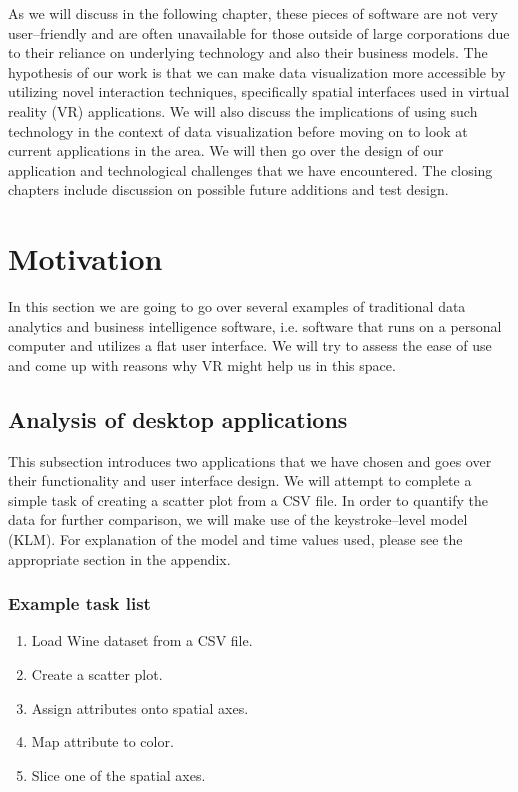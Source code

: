 \documentclass{article}
\begin{document}
As we will discuss in the following chapter, these pieces of software are not very user--friendly and are often unavailable for those outside of large corporations due to their reliance on underlying technology and also their business models. The hypothesis of our work is that we can make data visualization more accessible by utilizing novel interaction techniques, specifically spatial interfaces used in virtual reality (VR) applications. We will also discuss the implications of using such technology in the context of data visualization before moving on to look at current applications in the area. We will then go over the design of our application and technological challenges that we have encountered. The closing chapters include discussion on possible future additions and test design.

\newpage

\section{Motivation}

In this section we are going to go over several examples of traditional data analytics and business intelligence software, i.e. software that runs on a personal computer and utilizes a flat user interface. We will try to assess the ease of use and come up with reasons why VR might help us in this space.

\subsection{Analysis of desktop applications}

This subsection introduces two applications that we have chosen and goes over their functionality and user interface design. We will attempt to complete a simple task of creating a scatter plot from a CSV file. In order to quantify the data for further comparison, we will make use of the keystroke--level model (KLM).\cite{klm} For explanation of the model and time values used, please see the appropriate section in the appendix.

\subsubsection{Example task list}

\begin{enumerate}
    \item Load Wine dataset from a CSV file.
    \item Create a scatter plot.
    \item Assign attributes onto spatial axes.
    \item Map attribute to color.
    \item Slice one of the spatial axes.
\end{enumerate}
\end{document}
